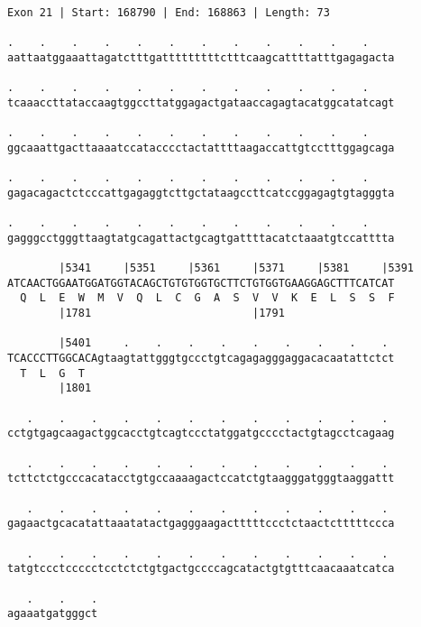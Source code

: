 \documentclass{article}
\begin{document}
\begin{Verbatim}
Exon 21 | Start: 168790 | End: 168863 | Length: 73
 
.    .    .    .    .    .    .    .    .    .    .    .    
aattaatggaaattagatctttgatttttttttctttcaagcattttatttgagagacta
  
.    .    .    .    .    .    .    .    .    .    .    .    
tcaaaccttataccaagtggccttatggagactgataaccagagtacatggcatatcagt
  
.    .    .    .    .    .    .    .    .    .    .    .    
ggcaaattgacttaaaatccatacccctactattttaagaccattgtcctttggagcaga
  
.    .    .    .    .    .    .    .    .    .    .    .    
gagacagactctcccattgagaggtcttgctataagccttcatccggagagtgtagggta
  
.    .    .    .    .    .    .    .    .    .    .    .    
gagggcctgggttaagtatgcagattactgcagtgattttacatctaaatgtccatttta
  
        |5341     |5351     |5361     |5371     |5381     |5391
ATCAACTGGAATGGATGGTACAGCTGTGTGGTGCTTCTGTGGTGAAGGAGCTTTCATCAT
  Q  L  E  W  M  V  Q  L  C  G  A  S  V  V  K  E  L  S  S  F
        |1781                         |1791                 
  
        |5401     .    .    .    .    .    .    .    .    . 
TCACCCTTGGCACAgtaagtattgggtgccctgtcagagagggaggacacaatattctct
  T  L  G  T                                                
        |1801                                               
  
   .    .    .    .    .    .    .    .    .    .    .    . 
cctgtgagcaagactggcacctgtcagtccctatggatgcccctactgtagcctcagaag
  
   .    .    .    .    .    .    .    .    .    .    .    . 
tcttctctgcccacatacctgtgccaaaagactccatctgtaagggatgggtaaggattt
  
   .    .    .    .    .    .    .    .    .    .    .    . 
gagaactgcacatattaaatatactgagggaagactttttccctctaactctttttccca
  
   .    .    .    .    .    .    .    .    .    .    .    . 
tatgtccctccccctcctctctgtgactgccccagcatactgtgtttcaacaaatcatca
  
   .    .    .
agaaatgatgggct
\end{Verbatim}
\newpage
\end{document}
